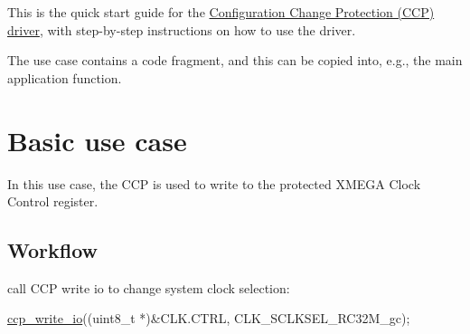 This is the quick start guide for the \hyperlink{group__ccp__group}{Configuration Change Protection (C\-C\-P) driver}, with step-\/by-\/step instructions on how to use the driver.

The use case contains a code fragment, and this can be copied into, e.\-g., the main application function.\hypertarget{xmega_ccp_quickstart_ccp_basic_use_case}{}\section{Basic use case}\label{xmega_ccp_quickstart_ccp_basic_use_case}
In this use case, the C\-C\-P is used to write to the protected X\-M\-E\-G\-A Clock Control register.\hypertarget{xmega_ccp_quickstart_ccp_basic_use_case_setup_flow}{}\subsection{Workflow}\label{xmega_ccp_quickstart_ccp_basic_use_case_setup_flow}

\begin{DoxyEnumerate}
\item call C\-C\-P write io to change system clock selection\-:
\begin{DoxyItemize}
\item 
\begin{DoxyCode}
 \hyperlink{group__ccp__group_gaa5e4806ffd4f56e4907009ad87b769da}{ccp\_write\_io}((uint8\_t *)&CLK.CTRL, CLK\_SCLKSEL\_RC32M\_gc); 
\end{DoxyCode}
 
\end{DoxyItemize}
\end{DoxyEnumerate}